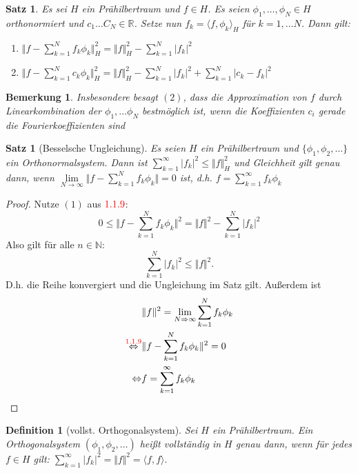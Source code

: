 \documentclass[12pt,titlepage]{article}
\newtheorem{definition}[zahl]{Definition}
\newtheorem{bemerkung}[zahl]{Bemerkung}
\newtheorem{satz}[zahl]{Satz}
\numberwithin{equation}{section}
\begin{document}
 \begin{satz}
 Es sei $H$ ein Prähilbertraum und $f \in H$. Es seien $\phi_1,\ldots,\phi_N \in H$ orthonormiert und $c_1 \ldots C_N \in \mathbb{R}$. Setze nun $f_k=\langle f, \phi_k\rangle_H$ für $k=1,\ldots N$. Dann gilt:
 \begin{enumerate}
 \item $\Vert f- \sum_{k=1}^Nf_k\phi_k\Vert_H^2=\Vert f\Vert_H^2- \sum_{k=1}^N \vert f_k\vert^2$
 \item $\Vert f- \sum_{k=1}^Nc_k\phi_k\Vert_H^2=\Vert f\Vert_{H}^2-\sum_{k=1}^N \vert f_k\vert^2+\sum_{k=1}^N \vert c_k- f_k\vert^2$
 \end{enumerate}
 \end{satz}
 \begin{bemerkung}
 Insbesondere besagt $(2)$, dass die Approximation von $f$ durch Linearkombination der $\phi_1, \ldots \phi_N$ bestmöglich ist, wenn die Koeffizienten $c_i$ gerade die Fourierkoeffizienten sind
  \end{bemerkung}
  \begin{satz}[Besselsche Ungleichung]
  Es seien $H$ ein Prähilbertraum und $\{\phi_1,\phi_2, \ldots\}$ ein Orthonormalsystem. Dann ist $\sum_{k=1}^{\infty} \vert f_k \vert^2 \leq \Vert f \Vert_H^2$ und Gleichheit gilt genau dann, wenn $\underset{N\rightarrow \infty}{\lim}\Vert f-\sum_{k=1}^{N}f_k \phi_k\Vert=0$ ist, d.h. $f= \sum_{k=1}^{\infty}f_k \phi_k$
  \end{satz}
  \begin{proof}
  Nutze $(1)$ aus $\textcolor{red}{1.1.9}$:
  \[
0\leq   \Vert f- \sum_{k=1}^N f_k\phi_k\Vert^2= \Vert f \Vert^2-\sum_{k=1}^{N} \vert f_k \vert^2
  \]
  Also gilt für alle $n \in \mathbb{N}:$
  \[
  \sum_{k=1}^{N} \vert f_k \vert^2 \leq \Vert f \Vert^2.
  \]
  D.h. die Reihe konvergiert und die Ungleichung im Satz gilt. Außerdem ist \begin{align*}
  &\Vert f \Vert^2=\underset{N \Rightarrow \infty}{\lim}\sum_{k=1}^Nf_k \phi_k\\
  \overset{\textcolor{red}{1.1.9}}{\Leftrightarrow}& \Vert f- \sum_{k=1}^Nf_k\phi_k \Vert^2=0\\
 \Leftrightarrow &f=\sum_{k=1}^{\infty}f_k\phi_k
  \end{align*}
   \end{proof}
 \begin{definition}[vollst. Orthogonalsystem]
 Sei $H$ ein Prähilbertraum. Ein Orthogonalsystem $(\phi_1,\phi_2, \ldots)$ heißt vollständig in $H$ genau dann, wenn für jedes $f \in H$ gilt: $\sum_{k=1}^{\infty}\vert f_k\vert^2=\Vert f \Vert^2=\langle f,f \rangle.$
 \end{definition}
\end{document}
